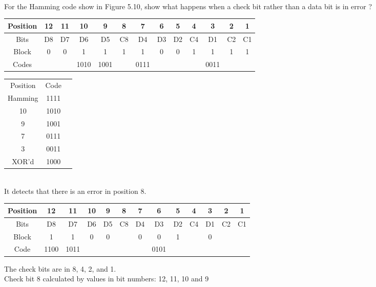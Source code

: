 \documentclass[12pt,largemargins]{homework}
\date{Septemeber 6, 2018}
\begin{document}
\maketitle
{}\\
For the Hamming code show in Figure 5.10, show what happens when a check bit rather than a data bit is in error ?\\
\begin{center}
	\begin{tabular}{|c|c|c|c|c|c|c|c|c|c|c|c|c|}
		\hline
		Position & 12 & 11 & 10 & 9 & 8 & 7 & 6 & 5 & 4 & 3 & 2 & 1\\
		\hline 
		Bits  & D8  & D7 & D6 & D5 & C8 & D4 & D3 & D2 & C4 & D1 & C2 & C1\\
		\hline
		Block  & 0 & 0 & 1 & 1 & 1 & 1 & 0 & 0 & 1 & 1 & 1 & 1\\
		\hline
		Codes  & & & 1010 & 1001  &  & 0111 & & & & 0011 & & \\
		\hline 
	\end{tabular}
	
	\begin{tabular}{|c|c|c|}
		\hline
		Position & Code\\
		Hamming & 1111\\
		10 & 1010\\
		9 & 1001\\
		7 & 0111\\
		3 & 0011\\
		XOR'd & 1000\\
		\hline
	\end{tabular}\\
	It detects that there is an error in position 8.\\
\end{center}
\begin{center}
	\begin{tabular}{|c|c|c|c|c|c|c|c|c|c|c|c|c|}
		\hline
		Position & 12 & 11 & 10 & 9 & 8 & 7 & 6 & 5 & 4 & 3 & 2 & 1\\
		\hline 
		Bits  & D8  & D7 & D6 & D5 & C8 & D4 & D3 & D2 & C4 & D1 & C2 & C1\\
		\hline
		Block & 1 & 1 & 0 & 0 &   & 0 & 0 & 1 &  & 0 &  & \\
		\hline
		Code  & 1100 & 1011 &  &  &  &  & 0101 &  &  &  & \\
		\hline
		\end{tabular}
\end{center}
The check bits are in 8, 4, 2, and 1.\\
Check bit 8 calculated by values in bit numbers: 12, 11, 10 and 9 \\
\end{document}
